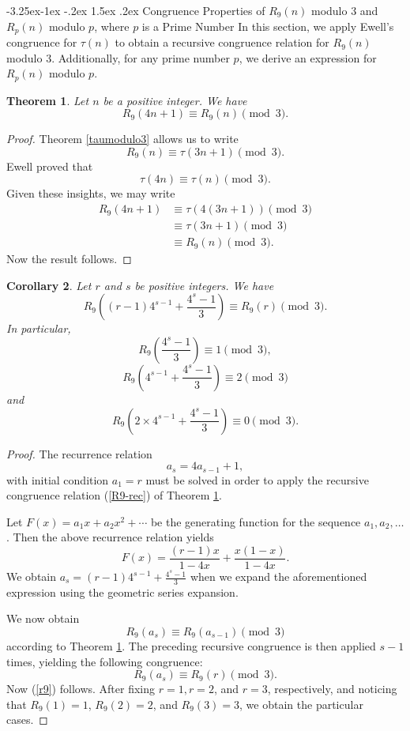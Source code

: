 \documentclass[10pt]{article}
\makeatletter
\renewcommand\subsection{\@startsection{subsection}{2}{\z@}
{-3.25ex\@plus -1ex \@minus -.2ex}
{1.5ex \@plus .2ex}
{\normalfont\normalsize\bfseries\boldmath}}
\newtheorem{theorem}{Theorem}[section]
\newtheorem{corollary}[theorem]{Corollary}
\theoremstyle{definition}
\makeatother
\begin{document}
\subsection{ Congruence Properties of $R_9(n)$ modulo ${3}$ and $R_p(n)$ modulo ${p}$, where $p$ is a Prime Number}
In this section, we apply Ewell's congruence for $\tau(n)$ to obtain a recursive congruence relation for $R_9(n)$ modulo $3$. Additionally, for any prime number $p$, we derive an expression for $R_p(n)$ modulo ${p}$.
\begin{theorem}\label{nine-regular}
Let $n$ be a positive integer. We have
\begin{equation}\label{R9-rec}
R_9(4n+1)\equiv R_9(n)\pmod{3}.
\end{equation}
\end{theorem}
\begin{proof}
Theorem \ref{taumodulo3} allows us to write
$$
R_9(n)\equiv \tau(3n+1)\pmod 3.
$$
Ewell \cite{ewell} proved that 
$$
\tau(4n)\equiv\tau(n)\pmod{3}.
$$
Given these insights, we may write
\begin{align*}
R_9(4n+1)&\equiv\tau(4(3n+1))\pmod{3}\\
&\equiv\tau(3n+1)\pmod{3}\\
&\equiv R_9(n)\pmod{3}.
\end{align*}
Now the result follows.
\end{proof}
\begin{corollary} Let $r$ and $s$ be positive integers. We have
\begin{equation}\label{r9}
R_9\left((r-1)4^{s-1}+\frac{4^{s}-1}{3}\right)\equiv R_9(r)\pmod{3}.
\end{equation}
In particular,
\[R_9\left(\frac{4^s-1}{3}\right)\equiv1\pmod{3},
\]
\[R_9\left(4^{s-1}+\frac{4^s-1}{3}\right)\equiv2\pmod{3}
\]
and
\[R_9\left(2\times 4^{s-1}+\frac{4^s-1}{3}\right)\equiv0\pmod{3}.
\]
\end{corollary}
\begin{proof}
The recurrence relation \[a_{s}=4a_{s-1}+1, \] with initial condition $a_1=r$ must be solved in order to apply the recursive congruence relation (\ref{R9-rec}) of Theorem \ref{nine-regular}.

Let $F(x)=a_1x+a_2x^2+\cdots $ be the generating function for the sequence $a_1,a_2,\ldots$. Then the above recurrence relation yields
\[F(x)=\frac{(r-1)x}{1-4x}+\frac{x(1-x)}{1-4x}.
\]
We obtain $a_s=(r-1)4^{s-1}+\frac{4^s-1}{3}$ when we expand the aforementioned expression using the geometric series expansion. 

We now obtain \[R_9(a_s)\equiv R_9(a_{s-1})\pmod{3}\] according to Theorem \ref{nine-regular}.
The preceding recursive congruence is then applied $s-1$ times, yielding the following congruence: 
\[R_9(a_s)\equiv R_9(r)\pmod{3}.\]
Now (\ref{r9}) follows. After fixing $r=1, r=2$, and $r=3$, respectively, and noticing that $R_9(1)=1$, $R_9(2)=2$, and $R_9(3)=3$, we obtain the particular cases.
\end{proof}
\end{document}
